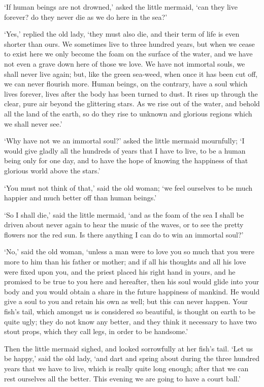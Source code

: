 `If human beings are not drowned,' asked the little mermaid,
`can they live forever? do they never die as we do here in the sea?'

`Yes,' replied the old lady, `they must also die, and their term
of life is even shorter than ours. 
We sometimes live to three
hundred years, but when we cease to exist here we only become the foam
on the surface of the water, and we have not even a grave down here of
those we love. 
We have not immortal souls, we shall never live
again; but, like the green sea-weed, when once it has been cut off, we
can never flourish more. 
Human beings, on the contrary, have a soul
which lives forever, lives after the body has been turned to dust.
It rises up through the clear, pure air beyond the glittering stars.
As we rise out of the water, and behold all the land of the earth,
so do they rise to unknown and glorious regions which we shall never
see.'

`Why have not we an immortal soul?' asked the little mermaid
mournfully; `I would give gladly all the hundreds of years that I have
to live, to be a human being only for one day, and to have the hope of
knowing the happiness of that glorious world above the stars.'

`You must not think of that,' said the old woman; `we feel
ourselves to be much happier and much better off than human beings.'

`So I shall die,' said the little mermaid, `and as the foam of the
sea I shall be driven about never again to hear the music of the
waves, or to see the pretty flowers nor the red sun. 
Is there anything
I can do to win an immortal soul?'

`No,' said the old woman, `unless a man were to love you so much
that you were more to him than his father or mother; and if all his
thoughts and all his love were fixed upon you, and the priest placed
his right hand in yours, and he promised to be true to you here and
hereafter, then his soul would glide into your body and you would
obtain a share in the future happiness of mankind. 
He would give a
soul to you and retain his own as well; but this can never happen.
Your fish's tail, which amongst us is considered so beautiful, is
thought on earth to be quite ugly; they do not know any better, and
they think it necessary to have two stout props, which they call legs,
in order to be handsome.'

Then the little mermaid sighed, and looked sorrowfully at her
fish's tail. 
`Let us be happy,' said the old lady, `and dart and
spring about during the three hundred years that we have to live,
which is really quite long enough; after that we can rest ourselves
all the better. 
This evening we are going to have a court ball.'

